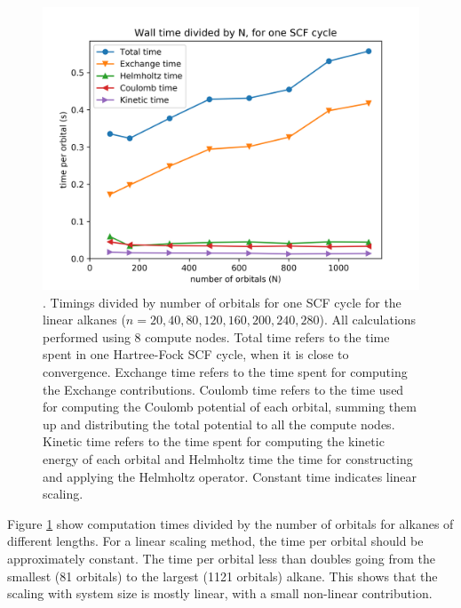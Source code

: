 \documentclass[journal=jctcce, manuscript=article]{achemso}
\begin{document}
\begin{figure}
\centering
\includegraphics[width=1.\textwidth]{Times_nAlkanes.png}
\caption{\label{fig02}. Timings divided by number of orbitals for one \ac{SCF} cycle for the linear alkanes  ($n=20, 40, 80, 120, 160, 200, 240, 280$). All calculations performed using 8 compute nodes. Total time refers to the time spent in one Hartree-Fock \ac{SCF} cycle, when it is close to convergence. Exchange time refers to the time spent for computing the Exchange contributions. Coulomb time refers to the time used for computing the Coulomb potential of each orbital, summing them up and distributing the total potential to all the compute nodes. Kinetic time refers to the time spent for computing the kinetic energy of each orbital  and Helmholtz time the time for constructing and applying the Helmholtz operator. Constant time indicates linear scaling.}
\end{figure}

Figure \ref{fig02} show computation times divided by the number of orbitals for alkanes of different lengths. For a linear scaling method, the time per orbital should be approximately constant.  The time per orbital less than doubles going from the smallest (81 orbitals) to the largest (1121 orbitals) alkane. This shows that the scaling with system size is mostly linear, with a small non-linear contribution.  

\end{document}

